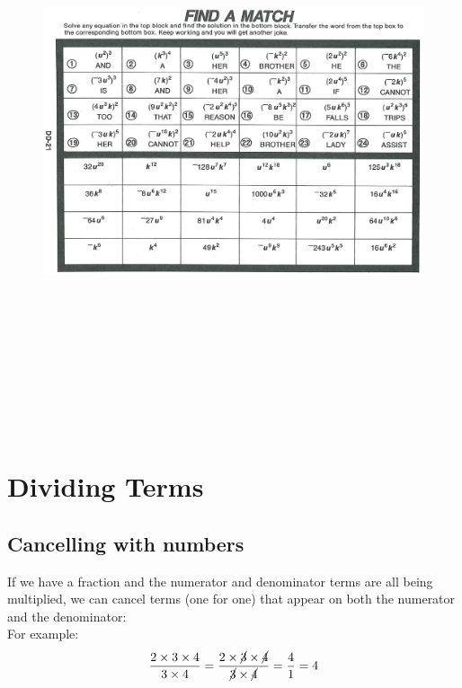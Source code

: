 \documentclass[a4paper,12pt]{article}
\begin{document}
\begin{figure}[!h]
	\centering
	\includegraphics[height=17cm, angle=90, origin=c]{pizzazz/pizzazz_set1_1.pdf}
\end{figure}
\newpage

\section{Dividing Terms}
\subsection{Cancelling with numbers}
If we have a fraction and the numerator and denominator terms are all being multiplied,
we can cancel terms (one for one) that appear on both the numerator and the denominator:\\
For example:
\begin{align*}
\frac{2\times 3 \times 4}{3\times 4}=\frac{2 \times \cancel{3} \times \cancel{4}}{\cancel{3}\times \cancel{4}}= \frac{4}{1} = 4
\end{align*}
\end{document}
